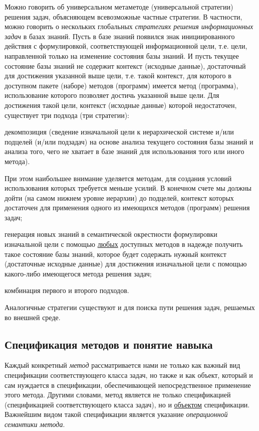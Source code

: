 Можно говорить об универсальном метаметоде (универсальной стратегии) решения задач, объясняющем всевозможные частные стратегии.
В частности, можно говорить о нескольких глобальных \textit{стратегиях решения информационных задач} в базах знаний. Пусть в базе знаний появился знак инициированного действия с формулировкой, соответствующей информационной цели, т.е. цели, направленной только на изменение состояния базы знаний. И пусть текущее состояние базы знаний не содержит контекст (исходные данные), достаточный для достижения указанной выше цели, т.е. такой контекст, для которого в доступном пакете (наборе) методов (программ) имеется метод (программа), использование которого позволяет достичь указанной выше цели. Для достижения такой цели, контекст (исходные данные) которой недостаточен, существует три подхода (три стратегии):
\begin{textitemize}
	\item декомпозиция (сведение изначальной цели к иерархической системе и/или подцелей (и/или подзадач) на основе анализа текущего состояния базы знаний и анализа того, чего не хватает в базе знаний для использования того или иного метода).

	При этом наибольшее внимание уделяется методам, для создания условий использования которых требуется меньше усилий. В конечном счете мы должны дойти (на самом нижнем уровне иерархии) до подцелей, контекст которых достаточен для применения одного из имеющихся методов (программ) решения задач;
	\item генерация новых знаний в семантической окрестности формулировки изначальной цели с помощью \underline{любых} доступных методов в надежде получить такое состояние базы знаний, которое будет содержать нужный контекст (достаточные исходные данные) для достижения изначальной цели с помощью какого-либо имеющегося метода решения задач;
	\item комбинация первого и второго подходов.
\end{textitemize}
Аналогичные стратегии существуют и для поиска пути решения задач, решаемых во внешней среде.

\subsection{Спецификация методов и понятие навыка}
\label{subsec_skill_concept}

Каждый конкретный \textit{метод} рассматривается нами не только как важный вид спецификации соответствующего класса задач, но также и как объект, который и сам нуждается в спецификации, обеспечивающей непосредственное применение этого метода. Другими словами, метод является не только спецификацией (спецификацией соответствующего класса задач), но и \underline{объектом} спецификации. Важнейшим видом такой спецификации является указание \textit{операционной семантики метода}.

